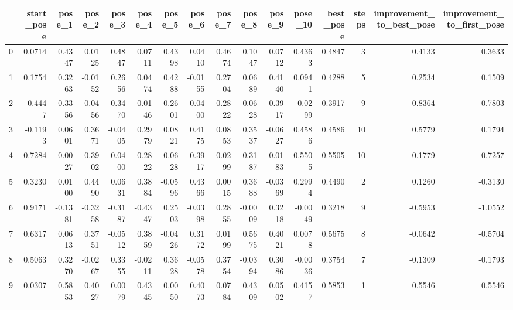 \begin{tabular}{lrrrrrrrrrrrrrrr}
\toprule
{} &  start\_pose &  pose\_1 &  pose\_2 &  pose\_3 &  pose\_4 &  pose\_5 &  pose\_6 &  pose\_7 &  pose\_8 &  pose\_9 &  pose\_10 &  best\_pose &  steps &  improvement\_to\_best\_pose &  improvement\_to\_first\_pose \\
\midrule
0   &      0.0714 &  0.4347 &  0.0125 &  0.4847 &  0.0711 &  0.4398 &  0.0410 &  0.4674 &  0.1047 &  0.0712 &   0.4363 &     0.4847 &      3 &                    0.4133 &                     0.3633 \\
1   &      0.1754 &  0.3263 & -0.0152 &  0.2656 &  0.0474 &  0.4288 & -0.0155 &  0.2704 &  0.0689 &  0.4140 &   0.0941 &     0.4288 &      5 &                    0.2534 &                     0.1509 \\
2   &     -0.4447 &  0.3356 & -0.0456 &  0.3470 & -0.0146 &  0.2601 & -0.0400 &  0.2822 &  0.0628 &  0.3917 &  -0.0299 &     0.3917 &      9 &                    0.8364 &                     0.7803 \\
3   &     -0.1193 &  0.0601 &  0.3671 & -0.0405 &  0.2979 &  0.0821 &  0.4175 &  0.0853 &  0.3537 & -0.0627 &   0.4586 &     0.4586 &     10 &                    0.5779 &                     0.1794 \\
4   &      0.7284 &  0.0027 &  0.3902 & -0.0400 &  0.2822 &  0.0628 &  0.3917 & -0.0299 &  0.3187 &  0.0183 &   0.5505 &     0.5505 &     10 &                   -0.1779 &                    -0.7257 \\
5   &      0.3230 &  0.0100 &  0.4490 &  0.0631 &  0.3884 & -0.0596 &  0.4366 &  0.0015 &  0.3688 & -0.0369 &   0.2994 &     0.4490 &      2 &                    0.1260 &                    -0.3130 \\
6   &      0.9171 & -0.1381 & -0.3258 & -0.3187 & -0.4347 &  0.2503 & -0.0398 &  0.2855 & -0.0009 &  0.3218 &  -0.0049 &     0.3218 &      9 &                   -0.5953 &                    -1.0552 \\
7   &      0.6317 &  0.0613 &  0.3751 & -0.0512 &  0.3859 & -0.0426 &  0.3172 &  0.0199 &  0.5675 &  0.4021 &   0.0078 &     0.5675 &      8 &                   -0.0642 &                    -0.5704 \\
8   &      0.5063 &  0.3270 & -0.0267 &  0.3355 & -0.0211 &  0.3628 & -0.0578 &  0.3754 & -0.0394 &  0.3086 &  -0.0036 &     0.3754 &      7 &                   -0.1309 &                    -0.1793 \\
9   &      0.0307 &  0.5853 &  0.4027 &  0.0079 &  0.4345 &  0.0050 &  0.4073 &  0.0784 &  0.4309 &  0.0502 &   0.4157 &     0.5853 &      1 &                    0.5546 &                     0.5546 \\

\end{tabular}
